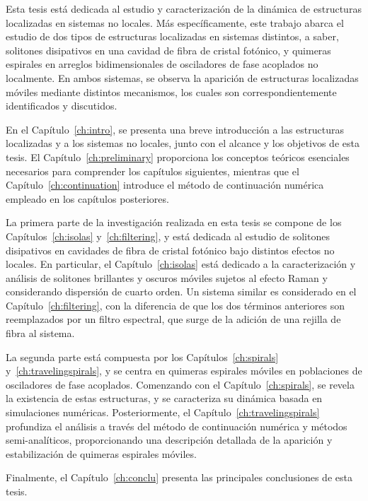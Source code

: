 \begin{resumen}
    Esta tesis está dedicada al estudio y caracterización de la dinámica de estructuras
    localizadas en sistemas no locales. Más específicamente, este trabajo abarca el estudio de dos
    tipos de estructuras localizadas en sistemas distintos, a saber, solitones disipativos
    en una cavidad de fibra de cristal fotónico, y quimeras espirales en arreglos bidimensionales
    de osciladores de fase acoplados no localmente. En ambos sistemas, se observa la aparición
    de estructuras localizadas móviles mediante distintos mecanismos, los cuales son correspondientemente identificados y discutidos.

    En el Capítulo~\ref{ch:intro}, se presenta una breve introducción a las estructuras localizadas y a los sistemas no locales,
    junto con el alcance y los objetivos de esta tesis. El Capítulo~\ref{ch:preliminary} proporciona los conceptos teóricos esenciales
    necesarios para comprender los capítulos siguientes, mientras que el Capítulo~\ref{ch:continuation} introduce el método de continuación
    numérica empleado en los capítulos posteriores.

    La primera parte de la investigación realizada en esta tesis se compone de los Capítulos~\ref{ch:isolas} y~\ref{ch:filtering},
    y está dedicada al estudio de solitones disipativos en cavidades de fibra de cristal fotónico bajo distintos efectos no locales.
    En particular, el Capítulo~\ref{ch:isolas} está dedicado a la caracterización y análisis de solitones brillantes y oscuros
    móviles sujetos al efecto Raman y considerando dispersión de cuarto orden. Un sistema similar
    es considerado en el Capítulo~\ref{ch:filtering}, con la diferencia de que los dos términos anteriores
    son reemplazados por un filtro espectral, que surge de la adición de una rejilla de fibra al sistema.

    La segunda parte está compuesta por los Capítulos~\ref{ch:spirals} y~\ref{ch:travelingspirals},
    y se centra en quimeras espirales móviles en poblaciones de osciladores de fase acoplados. Comenzando
    con el Capítulo~\ref{ch:spirals}, se revela la existencia de estas estructuras, y se caracteriza su
    dinámica basada en simulaciones numéricas. Posteriormente, el Capítulo~\ref{ch:travelingspirals}
    profundiza el análisis a través del método de continuación numérica y métodos semi-analíticos, proporcionando
    una descripción detallada de la aparición y estabilización de quimeras espirales móviles.

    Finalmente, el Capítulo~\ref{ch:conclu} presenta las principales conclusiones de esta tesis.
\end{resumen}

